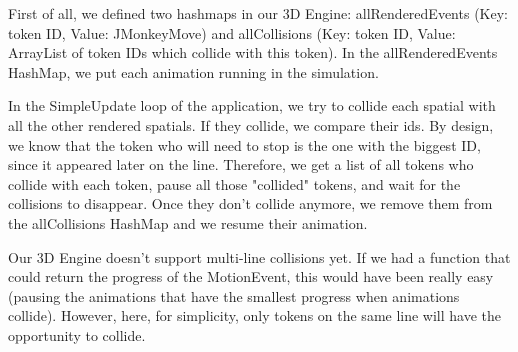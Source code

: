 First of all, we defined two hashmaps in our 3D Engine: allRenderedEvents (Key: token ID, Value: JMonkeyMove) and allCollisions (Key: token ID, Value: ArrayList of token IDs which collide with this token).
In the allRenderedEvents HashMap, we put each animation running in the simulation. 

In the SimpleUpdate loop of the application, we try to collide each spatial with all the other rendered spatials. If they collide, we compare their ids. By design, we know that the token who will need to stop is the one with the biggest ID, since it appeared later on the line. Therefore, we get a list of all tokens who collide with each token, pause all those "collided" tokens, and wait for the collisions to disappear. Once they don't collide anymore, we remove them from the allCollisions HashMap and we resume their animation.

Our 3D Engine doesn't support multi-line collisions yet. If we had a function that could return the progress of the MotionEvent, this would have been really easy (pausing the animations that have the smallest progress when animations collide). However, here, for simplicity, only tokens on the same line will have the opportunity to collide.